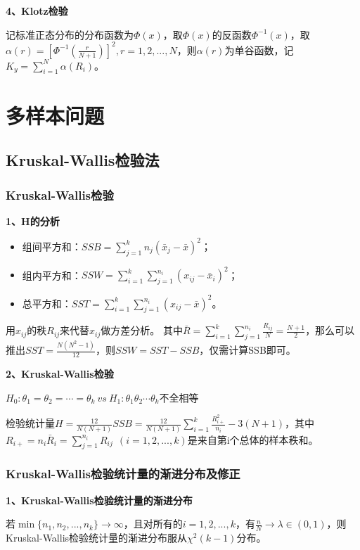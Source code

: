 \documentclass[lang=cn,10pt]{elegantbook}
\begin{document}
\textbf{4、Klotz检验}

记标准正态分布的分布函数为$\Phi(x)$，取$\Phi(x)$的反函数$\Phi^{-1}(x)$，取$\alpha(r) = [\Phi^{-1}(\frac{r}{N+1})]^2,r = 1,2,...,N$，则$\alpha(r)$为单谷函数，记$K_y = \sum_{i = 1}^N\alpha(R_i)$。

\chapter{多样本问题}
\section{Kruskal-Wallis检验法}
\subsection{Kruskal-Wallis检验}
\textbf{1、H的分析}

\begin{itemize}
    \item 组间平方和：$SSB = \sum_{j = 1}^kn_j (\bar{x}_j - \bar{x})^2$；
    \item 组内平方和：$SSW = \sum_{i = 1}^k\sum_{j = 1}^{n_i}(x_{ij} - \bar{x}_i)^2$；
    \item 总平方和：$SST = \sum_{i = 1}^k\sum_{j = 1}^{n_i}(x_{ij} - \bar{x})^2$。
\end{itemize}

用$x_{ij}$的秩$R_{ij}$来代替$x_{ij}$做方差分析。
其中$\bar{R} = \sum_{i = 1}^k\sum_{j = 1}^{n_i}\frac{R_{ij}}N = \frac{N+1}2$，那么可以推出$SST = \frac{N(N^2 - 1)}{12}$，则$SSW = SST - SSB$，仅需计算SSB即可。

\textbf{2、Kruskal-Wallis检验}

\begin{center}
    $H_0:\theta_1 = \theta_2 = \cdots = \theta_k ~vs~ H_1: \theta_1 \theta_2 \cdots \theta_k$不全相等
\end{center}

检验统计量$H = \frac{12}{N(N+1)}SSB = \frac{12}{N(N+1)}\sum_{i = 1}^k\frac{R_{i+}^2}{n_i} - 3 (N+1)$，其中$R_{i+} = n_i\bar{R}_i = \sum_{j = 1}^{n_i}R_{ij}~~(i = 1,2,...,k)$是来自第i个总体的样本秩和。

\subsection{Kruskal-Wallis检验统计量的渐进分布及修正}
\textbf{1、Kruskal-Wallis检验统计量的渐进分布}

若$\min\{n_1,n_2,...,n_k\} \rightarrow \infty$，且对所有的$i = 1,2,...,k$，有$\frac{n}{N} \rightarrow \lambda \in (0,1)$，则Kruskal-Wallis检验统计量的渐进分布服从$\chi^2(k-1)$分布。
\end{document}

